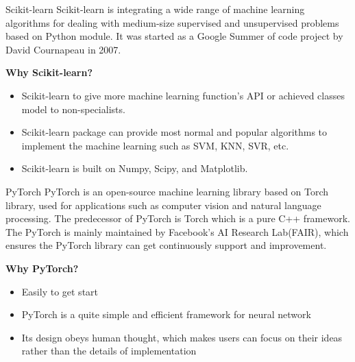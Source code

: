 \documentclass[10pt]{beamer}
\begin{document}
\begin{frame}{Scikit-learn}
Scikit-learn is integrating a wide range of machine learning algorithms for dealing with medium-size supervised and unsupervised problems based on Python module. It was started as a Google Summer of code project by David Cournapeau in 2007.\par
\textbf{Why Scikit-learn?}\par
\begin{itemize}
    \item Scikit-learn to give more machine learning function's API or achieved classes model to non-specialists.
    \item Scikit-learn package can provide most normal and popular algorithms to implement the machine learning such as  SVM, KNN, SVR, etc.
    \item Scikit-learn is built on Numpy, Scipy, and Matplotlib.
\end{itemize}
\end{frame}

\begin{frame}{PyTorch}
PyTorch is an open-source machine learning library based on Torch library, used for applications such as computer vision and natural language processing. The predecessor of PyTorch is Torch which is a pure C++ framework. The PyTorch is mainly maintained by Facebook's AI Research Lab(FAIR), which ensures the PyTorch library can get continuously support and improvement.\par
\textbf{Why PyTorch?}\par
\begin{itemize}
\item Easily to get start
\item PyTorch is a quite simple and efficient framework for neural network
\item Its design obeys  human thought, which makes users can focus on their ideas rather than the details of implementation
\end{itemize}
\end{frame}
\end{document}
